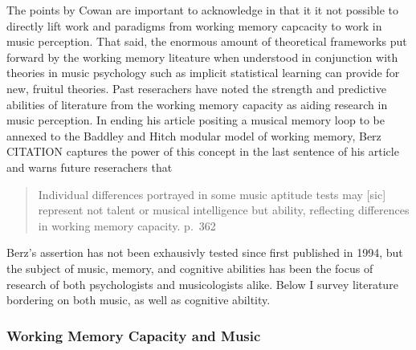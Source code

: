 \documentclass[]{book}
\theoremstyle{definition}
\theoremstyle{definition}
\theoremstyle{definition}
\theoremstyle{remark}
\begin{document}
The points by Cowan are important to acknowledge in that it it not
possible to directly lift work and paradigms from working memory
capcacity to work in music perception. That said, the enormous amount of
theoretical frameworks put forward by the working memory liteature when
understood in conjunction with theories in music psychology such as
implicit statistical learning \citep{saffranStatisticalLearningTone1999}
can provide for new, fruitul theories. Past reserachers have noted the
strength and predictive abilities of literature from the working memory
capacity as aiding research in music perception. In ending his article
positing a musical memory loop to be annexed to the Baddley and Hitch
modular model of working memory, Berz CITATION captures the power of
this concept in the last sentence of his article and warns future
reserachers that

\begin{quote}
Individual differences portrayed in some music aptitude tests may
{[}sic{]} represent not talent or musical intelligence but ability,
reflecting differences in working memory capacity. p.~362
\end{quote}

Berz's assertion has not been exhausivly tested since first published in
1994, but the subject of music, memory, and cognitive abilities has been
the focus of research of both psychologists and musicologists alike.
Below I survey literature bordering on both music, as well as cognitive
abiltity.

\hypertarget{working-memory-capacity-and-music}{%
\subsubsection{Working Memory Capacity and
Music}\label{working-memory-capacity-and-music}}
\end{document}
